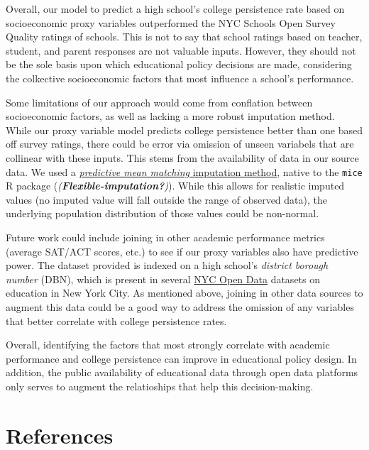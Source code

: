 \documentclass[
  man,floatsintext]{apa6}
\begin{document}
Overall, our model to predict a high school's college persistence rate based on socioeconomic proxy variables outperformed the NYC Schools Open Survey Quality ratings of schools. This is not to say that school ratings based on teacher, student, and parent responses are not valuable inputs. However, they should not be the sole basis upon which educational policy decisions are made, considering the colkective socioeconomic factors that most influence a school's performance.

Some limitations of our approach would come from conflation between socioeconomic factors, as well as lacking a more robust imputation method. While our proxy variable model predicts college persistence better than one based off survey ratings, there could be error via omission of unseen variabels that are collinear with these inputs. This stems from the availability of data in our source data. We used a \href{https://stefvanbuuren.name/fimd/sec-pmm.html}{\emph{predictive mean matching} imputation method}, native to the \texttt{mice} R package (\emph{(\textbf{Flexible-imputation?})}). While this allows for realistic imputed values (no imputed value will fall outside the range of observed data), the underlying population distribution of those values could be non-normal.

Future work could include joining in other academic performance metrics (average SAT/ACT scores, etc.) to see if our proxy variables also have predictive power. The dataset provided is indexed on a high school's \emph{district borough number} (DBN), which is present in several \href{https://opendata.cityofnewyork.us}{NYC Open Data} datasets on education in New York City. As mentioned above, joining in other data sources to augment this data could be a good way to address the omission of any variables that better correlate with college persistence rates.

Overall, identifying the factors that most strongly correlate with academic performance and college persistence can improve in educational policy design. In addition, the public availability of educational data through open data platforms only serves to augment the relatioships that help this decision-making.

\newpage

\hypertarget{references}{%
\section{References}\label{references}}
\end{document}
